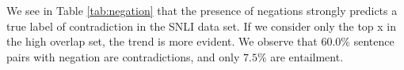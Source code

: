 \documentclass[10pt,letterpaper]{article}
\begin{document}
We see in Table \ref{tab:negation} that the presence of negations strongly predicts a true label of contradiction in the SNLI data set. If we consider only the top x in the high overlap set, the trend is more evident. 
We observe that $60.0 \%$ sentence pairs with negation are contradictions, and only $7.5 \%$ are entailment. \\

\end{document}
